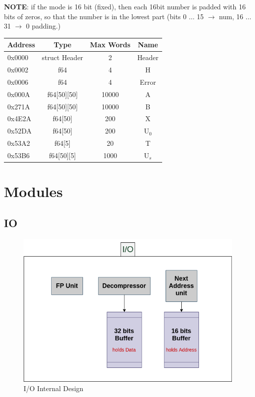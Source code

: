 \documentclass[12pt]{report}
\begin{document}
\textbf{NOTE}: if the mode is 16 bit (fixed), then each 16bit number is padded with 16 bits of zeros, so that the number is in the lowest part (bits 0 $\dots$ 15 $\rightarrow$ num, 16 $\dots$ 31 $\rightarrow$ 0 padding.)
\begin{center}
    \begin{tabular}{||l| c| c| c||} 
        \hline
        Address & Type & Max Words & Name  \\ [0.5ex] 
        \hline\hline
        0x0000 & struct Header & 2 & Header\\ 
        \hline
        0x0002 & f64 & 4 & H\\
        \hline
        0x0006 & f64 & 4 & Error\\
        \hline
        0x000A & f64[50][50] & 10000 & A\\
        \hline
        0x271A & f64[50][50] & 10000 & B\\
        \hline
        0x4E2A & f64[50] & 200 & X\\
        \hline
        0x52DA & f64[50] & 200 & U$_0$\\
        \hline
        0x53A2 & f64[5] & 20 & T\\
        \hline
        0x53B6 & f64[50][5] & 1000 & U$_s$\\
        \hline
       \end{tabular}
\end{center}

\section{Modules}

\subsection{IO}

\begin{figure}[hp]
    \centering
    \includegraphics[width=\textwidth]{images/IO}
    \caption{I/O Internal Design}
    \label{fig:io}
\end{figure}
\end{document}
